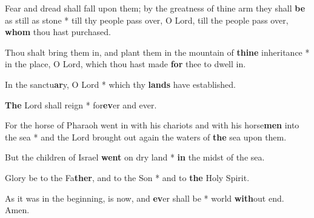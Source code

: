 \begin{multicols}{2}
	Fear and dread shall fall upon them; by the greatness of thine arm they shall \textbf{be} as still as stone * till thy people pass over, O Lord, till the people pass over, \textbf{whom} thou hast purchased.
	
	Thou shalt bring them in, and plant them in the mountain of \textbf{thine} inheritance * in the place, O Lord, which thou hast made \textbf{for} thee to dwell in.
	
	In the sanctu\textbf{ar}y, O Lord * which thy \textbf{lands} have established.
	
	\textbf{The} Lord shall reign * for\textbf{ev}er and ever.
	
	For the horse of Pharaoh went in with his chariots and with his horse\textbf{men} into the sea * and the Lord brought out again the waters of \textbf{the} sea upon them.
	
	But the children of Israel \textbf{went} on dry land * \textbf{in} the midst of the sea.
	
	Glory be to the Fa\textbf{ther}, and to the Son * and to \textbf{the} Holy Spirit.
	
	As it was in the beginning, is now, and \textbf{ev}er shall be * world \textbf{with}out end. Amen.
\end{multicols}
